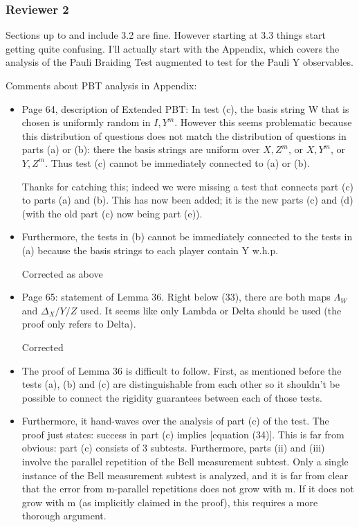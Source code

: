 \documentclass[12pt]{article}
\begin{document}
\subsubsection*{Reviewer 2}

Sections up to and include 3.2 are fine. However starting at 3.3 things start getting quite confusing. I'll actually start with the Appendix, which covers the analysis of the Pauli Braiding Test augmented to test for the Pauli Y observables.

Comments about PBT analysis in Appendix:

\begin{itemize}
\item Page 64, description of Extended PBT: In test (c), the basis string W that is chosen is uniformly random in ${I, Y}^m$. However this seems problematic because this distribution of questions does not match the distribution of questions in parts (a) or (b): there the basis strings are uniform over ${X,Z}^m$, or ${X,Y}^m$, or ${Y,Z}^m$. Thus test (c) cannot be immediately connected to (a) or (b).

{\color{blue} Thanks for catching this; indeed we were missing a test that connects part (c) to parts (a) and (b). This has now been added; it is the new parts (c) and (d) (with the old part (c) now being part (e)). }

\item Furthermore, the tests in (b) cannot be immediately connected to the tests in (a) because the basis strings to each player contain Y w.h.p.

{\color{blue} Corrected as above}

\item Page 65: statement of Lemma 36. Right below (33), there are both maps $\Lambda_W$ and $\Delta_X/Y/Z$ used. It seems like only Lambda or Delta should be used (the proof only refers to Delta).

{\color{blue} Corrected}


\item The proof of Lemma 36 is difficult to follow. First, as mentioned before the tests (a), (b) and (c) are distinguishable from each other so it shouldn't be possible to connect the rigidity guarantees between each of those tests.

\item Furthermore,  it hand-waves over the analysis of part (c) of the test. The proof just states: success in part (c) implies [equation (34)]. This is far from obvious: part (c) consists of 3 subtests. Furthermore, parts (ii) and (iii) involve the parallel repetition of the Bell measurement subtest. Only a single instance of the Bell measurement subtest is analyzed, and it is far from clear that the error from m-parallel repetitions does not grow with m.  If it does not grow with m (as implicitly claimed in the proof), this requires a more thorough argument.
\end{itemize}
\end{document}
